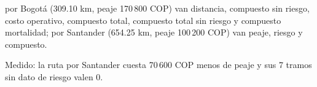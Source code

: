 {\raggedright por Bogotá (309.10 km, peaje 170\,800 COP) van distancia, compuesto sin riesgo, costo operativo, compuesto total, compuesto total sin riesgo y compuesto mortalidad; por Santander (654.25 km, peaje 100\,200 COP) van peaje, riesgo y compuesto.}
{Medido: la ruta por Santander cuesta 70\,600 COP menos de peaje y sus 7 tramos sin dato de riesgo valen 0.}

